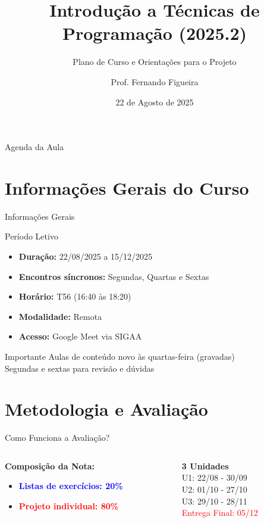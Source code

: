 \documentclass[10pt]{beamer}
\title{Introdução a Técnicas de Programação (2025.2)}
\subtitle{Plano de Curso e Orientações para o Projeto}
\author{Prof. Fernando Figueira}
\institute{DIMAp - UFRN}
\date{22 de Agosto de 2025}
\begin{document}
\frame{\titlepage}

\begin{frame}{Agenda da Aula}
	\tableofcontents[pausesections]
\end{frame}

\section{Informações Gerais do Curso}

\begin{frame}{Informações Gerais}
	\begin{block}{Período Letivo}
		\begin{itemize}
			\item \textbf{Duração:} 22/08/2025 a 15/12/2025
			\item \textbf{Encontros síncronos:} Segundas, Quartas e Sextas
			\item \textbf{Horário:} T56 (16:40 às 18:20)
			\item \textbf{Modalidade:} Remota
			\item \textbf{Acesso:} Google Meet via SIGAA
		\end{itemize}
	\end{block}
	
	\begin{alertblock}{Importante}
		Aulas de conteúdo novo às quartas-feira (gravadas)\\
		Segundas e sextas para revisão e dúvidas
	\end{alertblock}
\end{frame}

\section{Metodologia e Avaliação}

\begin{frame}{Como Funciona a Avaliação?}
	\begin{columns}
		\begin{column}{0.6\textwidth}
			\textbf{Composição da Nota:}
			\begin{itemize}
				\item \textcolor{blue}{\textbf{Listas de exercícios: 20\%}}
				\item \textcolor{red}{\textbf{Projeto individual: 80\%}}
			\end{itemize}
		\end{column}
		\begin{column}{0.4\textwidth}
			\begin{center}
				\textbf{3 Unidades}\\
				\bigskip
				U1: 22/08 - 30/09\\
				U2: 01/10 - 27/10\\
				U3: 29/10 - 28/11\\
				\bigskip
				\textcolor{red}{Entrega Final: 05/12}
			\end{center}
		\end{column}
	\end{columns}
\end{frame}
\end{document}
